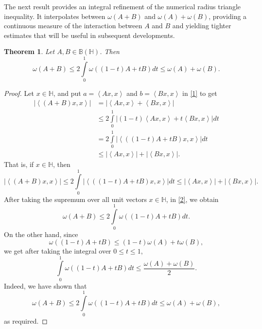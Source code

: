 \documentclass[12pt,twoside,reqno]{amsart}
\newtheorem{theorem}{Theorem}[section]
\numberwithin{equation}{section}
\begin{document}
The next result provides an integral refinement of the numerical radius triangle inequality. It interpolates between $\omega(A+B)$ and $\omega(A)+\omega(B)$, providing a continuous measure of the interaction between $A$ and $B$ and yielding tighter estimates that will be useful in subsequent developments.



\begin{theorem}\label{6}
Let $A,B\in \mathbb B\left( \mathbb H \right)$. Then
\[\omega \left( A+B \right)\le 2\int\limits_{0}^{1}{\omega \left( \left( 1-t \right)A+tB \right)dt}\le \omega \left( A \right)+\omega \left( B \right).\]
\end{theorem}
\begin{proof}
Let $x\in\mathbb{H}$, and put $a=\left\langle Ax,x \right\rangle $ and $b=\left\langle Bx,x \right\rangle $ in \eqref{1} to get
	\[\begin{aligned}
   \left| \left\langle \left( A+B \right)x,x \right\rangle  \right|&=\left| \left\langle Ax,x \right\rangle +\left\langle Bx,x \right\rangle  \right| \\ 
 & \le 2\int\limits_{0}^{1}{\left| \left( 1-t \right)\left\langle Ax,x \right\rangle +t\left\langle Bx,x \right\rangle  \right|dt} \\ 
 & =2\int\limits_{0}^{1}{\left| \left\langle \left( \left( 1-t \right)A+tB \right)x,x \right\rangle  \right|dt} \\ 
 & \le \left| \left\langle Ax,x \right\rangle  \right|+\left| \left\langle Bx,x \right\rangle  \right|. 
\end{aligned}\]
That is, if $x\in\mathbb{H}$, then
\begin{equation}\label{2}
\left| \left\langle \left( A+B \right)x,x \right\rangle  \right|\le 2\int\limits_{0}^{1}{\left| \left\langle \left( \left( 1-t \right)A+tB \right)x,x \right\rangle  \right|dt}\le \left| \left\langle Ax,x \right\rangle  \right|+\left| \left\langle Bx,x \right\rangle  \right|.
\end{equation}
After taking the supremum over all unit vectors $x\in \mathbb H$, in \eqref{2}, we obtain
	\[\omega \left( A+B \right)\le 2\int\limits_{0}^{1}{\omega \left( \left( 1-t \right)A+tB \right)dt}.\]
On the other hand, since 
	\[\omega \left( \left( 1-t \right)A+tB \right)\le \left( 1-t \right)\omega \left( A \right)+t\omega \left( B \right),\]
we get after taking the integral over $0\le t\le 1$, 
	\[\int\limits_{0}^{1}{\omega \left( \left( 1-t \right)A+tB \right)dt}\le \frac{\omega \left( A \right)+\omega \left( B \right)}{2}.\]
Indeed, we have shown that
\[\omega \left( A+B \right)\le 2\int\limits_{0}^{1}{\omega \left( \left( 1-t \right)A+tB \right)dt}\le \omega \left( A \right)+\omega \left( B \right),\]
as required.
\end{proof}
\end{document}
